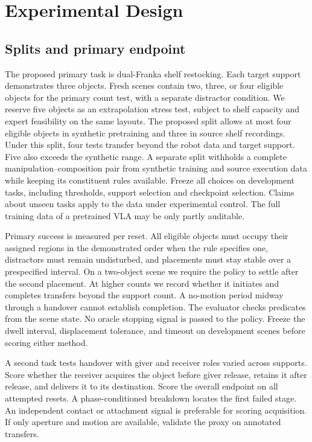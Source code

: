 \documentclass[letterpaper,10pt,conference]{ieeeconf}
\begin{document}
\section{Experimental Design}
\subsection{Splits and primary endpoint}
The proposed primary task is dual-Franka shelf restocking. Each target support demonstrates three objects. Fresh scenes contain two, three, or four eligible objects for the primary count test, with a separate distractor condition. We reserve five objects as an extrapolation stress test, subject to shelf capacity and expert feasibility on the same layouts. The proposed split allows at most four eligible objects in synthetic pretraining and three in source shelf recordings. Under this split, four tests transfer beyond the robot data and target support. Five also exceeds the synthetic range. A separate split withholds a complete manipulation--composition pair from synthetic training and source execution data while keeping its constituent rules available. Freeze all choices on development tasks, including thresholds, support selection and checkpoint selection. Claims about unseen tasks apply to the data under experimental control. The full training data of a pretrained VLA may be only partly auditable.

Primary success is measured per reset. All eligible objects must occupy their assigned regions in the demonstrated order when the rule specifies one, distractors must remain undisturbed, and placements must stay stable over a prespecified interval. On a two-object scene we require the policy to settle after the second placement. At higher counts we record whether it initiates and completes transfers beyond the support count. A no-motion period midway through a handover cannot establish completion. The evaluator checks predicates from the scene state. No oracle stopping signal is passed to the policy. Freeze the dwell interval, displacement tolerance, and timeout on development scenes before scoring either method.

A second task tests handover with giver and receiver roles varied across supports. Score whether the receiver acquires the object before giver release, retains it after release, and delivers it to its destination. Score the overall endpoint on all attempted resets. A phase-conditioned breakdown locates the first failed stage. An independent contact or attachment signal is preferable for scoring acquisition. If only aperture and motion are available, validate the proxy on annotated transfers.
\end{document}
